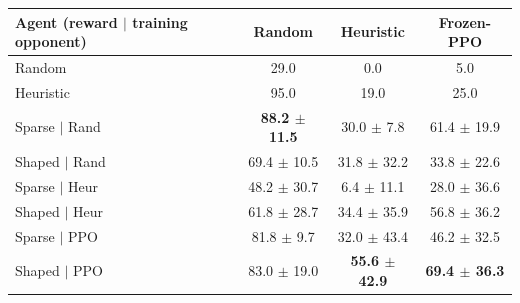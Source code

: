 \begin{tabular}{lccc}
\toprule
Agent (reward $|$ training opponent) & Random & Heuristic & Frozen-PPO \\
\midrule
Random & 29.0 & 0.0 & 5.0 \\
Heuristic & 95.0 & 19.0 & 25.0 \\
\midrule
Sparse $|$ Rand & \textbf{88.2 $\pm$ 11.5} & 30.0 $\pm$ 7.8 & 61.4 $\pm$ 19.9 \\
Shaped $|$ Rand & 69.4 $\pm$ 10.5 & 31.8 $\pm$ 32.2 & 33.8 $\pm$ 22.6 \\
Sparse $|$ Heur & 48.2 $\pm$ 30.7 & 6.4 $\pm$ 11.1 & 28.0 $\pm$ 36.6 \\
Shaped $|$ Heur & 61.8 $\pm$ 28.7 & 34.4 $\pm$ 35.9 & 56.8 $\pm$ 36.2 \\
Sparse $|$ PPO & 81.8 $\pm$ 9.7 & 32.0 $\pm$ 43.4 & 46.2 $\pm$ 32.5 \\
Shaped $|$ PPO & 83.0 $\pm$ 19.0 & \textbf{55.6 $\pm$ 42.9} & \textbf{69.4 $\pm$ 36.3} \\
\bottomrule
\end{tabular}
